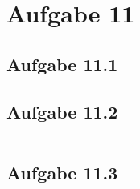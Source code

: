 \chapter{Aufgabe 11}
\section{Aufgabe 11.1}

\newpage
\section{Aufgabe 11.2}
\inputminted{cpp}{../task11/main.cpp}

\section{Aufgabe 11.3}
